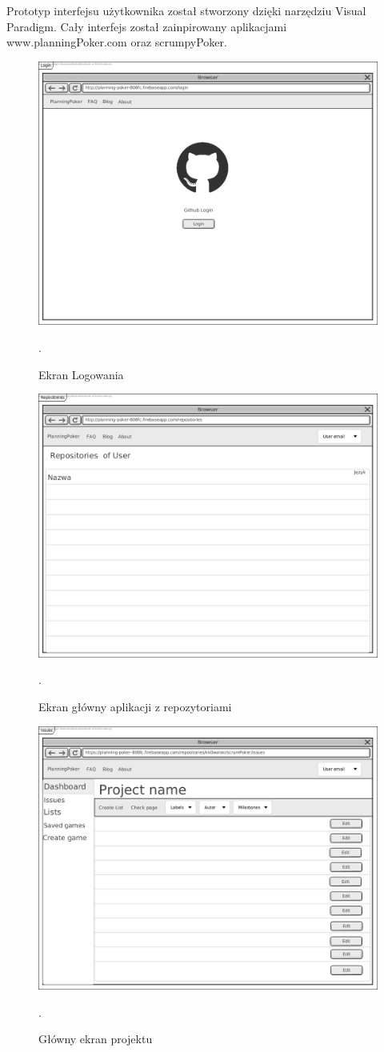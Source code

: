 Prototyp interfejsu użytkownika został stworzony dzięki narzędziu Visual Paradigm.
Cały interfejs został zainpirowany aplikacjami www.planningPoker.com oraz scrumpyPoker.

\begin{figure}[H]
	\centering\includegraphics[width=.5\textwidth]{img/LoginScreen}
	\caption{Ekran Logowania}.
	\label{rys:loginScreen}
\end{figure}

\begin{figure}[H]
	\centering\includegraphics[width=.7\textwidth]{img/RepositoriesScreen}
	\caption{Ekran główny aplikacji z repozytoriami}.
	\label{rys:RepositoriesScreen}
\end{figure}

\begin{figure}[H]
	\centering\includegraphics[width=.7\textwidth]{img/IssuesScreen}
	\caption{Główny ekran projektu}.
	\label{rys:IssuesScreen}
\end{figure}

